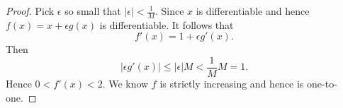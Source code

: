 \begin{Exercise}
	\begin{proof}
		Pick $\epsilon$ so small that $|\epsilon| < \frac{1}{M}$.
		Since $x$ is differentiable and hence $f(x) = x + \epsilon g(x)$ is differentiable.
		It follows that
		$$
		f'(x) = 1 + \epsilon g'(x).
		$$
		Then
		$$
		|\epsilon g'(x)| \leq |\epsilon| M < \frac{1}{M} M = 1.
		$$
		Hence $0 < f'(x) < 2$.
		We know $f$ is strictly increasing and hence is one-to-one.
	\end{proof}
\end{Exercise}